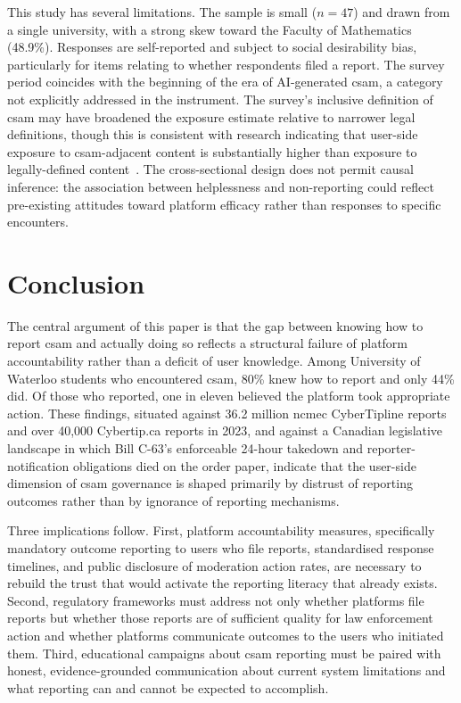 \documentclass{ieee-portfolio}
\begin{document}
This study has several limitations. The sample is small ($n = 47$) and drawn from a single university, with a strong skew toward the Faculty of Mathematics (48.9\%). Responses are self-reported and subject to social desirability bias, particularly for items relating to whether respondents filed a report. The survey period coincides with the beginning of the era of AI-generated \gls{csam}, a category not explicitly addressed in the instrument. The survey's inclusive definition of \gls{csam} may have broadened the exposure estimate relative to narrower legal definitions, though this is consistent with research indicating that user-side exposure to \gls{csam}-adjacent content is substantially higher than exposure to legally-defined content~\cite{aic_2022}. The cross-sectional design does not permit causal inference: the association between helplessness and non-reporting could reflect pre-existing attitudes toward platform efficacy rather than responses to specific encounters.
 
\section{Conclusion}
 
The central argument of this paper is that the gap between knowing how to report \gls{csam} and actually doing so reflects a structural failure of platform accountability rather than a deficit of user knowledge. Among University of Waterloo students who encountered \gls{csam}, 80\% knew how to report and only 44\% did. Of those who reported, one in eleven believed the platform took appropriate action. These findings, situated against 36.2 million \gls{ncmec} CyberTipline reports and over 40,000 Cybertip.ca reports in 2023, and against a Canadian legislative landscape in which Bill C-63's enforceable 24-hour takedown and reporter-notification obligations died on the order paper, indicate that the user-side dimension of \gls{csam} governance is shaped primarily by distrust of reporting outcomes rather than by ignorance of reporting mechanisms.
 
Three implications follow. First, platform accountability measures, specifically mandatory outcome reporting to users who file reports, standardised response timelines, and public disclosure of moderation action rates, are necessary to rebuild the trust that would activate the reporting literacy that already exists. Second, regulatory frameworks must address not only whether platforms file reports but whether those reports are of sufficient quality for law enforcement action and whether platforms communicate outcomes to the users who initiated them. Third, educational campaigns about \gls{csam} reporting must be paired with honest, evidence-grounded communication about current system limitations and what reporting can and cannot be expected to accomplish.
 
\end{document}
